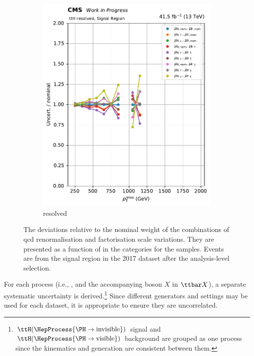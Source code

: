 \begin{figure}[htbp]
\begin{subfigure}[b]{0.34\textwidth}
        \includegraphics[width=\textwidth]{figures/qcd_scale_top_procs/ttbar/ratio_vars_SR_ttH_resolved.pdf}
        \caption{\ttH resolved}
    \end{subfigure}
    \caption[The deviations relative to the nominal weight of the combinations of QCD renormalisation and factorisation scale variations. They are presented as a function of \ptmiss in the \ttH categories for the \ttbar samples]{The deviations relative to the nominal weight of the combinations of \acrshort{qcd} renormalisation and factorisation scale variations. They are presented as a function of \ptmiss in the \ttH categories for the \ttbar samples. Events are from the signal region in the 2017 dataset after the analysis-level selection.}
    \label{fig:htoinv_ttbar_scale}
\end{figure}


For each process (i.e., \ttbar, and the accompanying boson $X$ in $\ttbar X$), a separate systematic uncertainty is derived.\footnote{$\ttH(\HepProcess{\PH \to \text{invisible}})$ signal and $\ttH(\HepProcess{\PH \to \text{visible}})$ background are grouped as one process since the kinematics and generation are consistent between them.} Since different generators and settings may be used for each dataset, it is appropriate to ensure they are uncorrelated.


